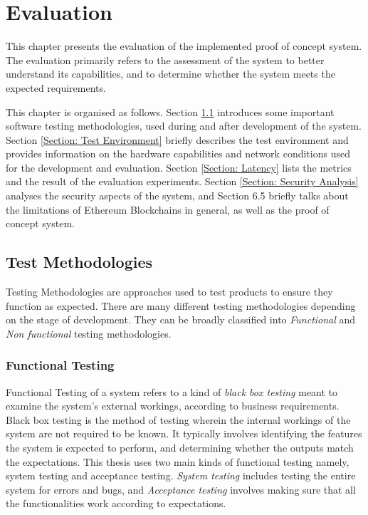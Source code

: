 \documentclass[english]{tktltiki}
\begin{document}
\newpage

\section{Evaluation}
This chapter presents the evaluation of the implemented proof of concept system. The evaluation primarily refers to the assessment of the system to better understand its capabilities, and to determine whether the system meets the expected requirements.

This chapter is organised as follows. Section \ref{Section: Test Methodologies} introduces some important software testing methodologies, used during and after development of the system. Section \ref{Section: Test Environment} briefly describes the test environment and provides information on the hardware capabilities and network conditions used for the development and evaluation. Section \ref{Section: Latency} lists the metrics and the result of the evaluation experiments. Section \ref{Section: Security Analysis} analyses the security aspects of the system, and Section 6.5 briefly talks about the limitations of Ethereum Blockchains in general, as well as the proof of concept system.

\subsection{Test Methodologies} \label{Section: Test Methodologies}
Testing Methodologies are approaches used to test products to ensure they function as expected. There are many different testing methodologies depending on the stage of development. They can be broadly classified into \textit{Functional} and \textit{Non functional} testing methodologies.

\subsubsection{Functional Testing}
Functional Testing of a system refers to a kind of \textit{black box testing} meant to examine the system's external workings, according to business requirements. Black box testing is the method of testing wherein the internal workings of the system are not required to be known. It typically involves identifying the features the system is expected to perform, and determining whether the outputs match the expectations. This thesis uses two main kinds of functional testing namely, system testing and acceptance testing. \textit{System testing} includes testing the entire system for errors and bugs, and \textit{Acceptance testing} involves making sure that all the functionalities work according to expectations. 
\end{document}
